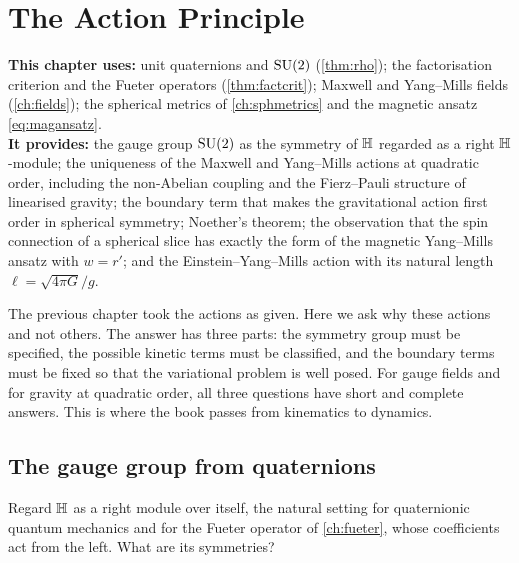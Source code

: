 \chapter{The Action Principle}
\label{ch:action}

\begin{usesbox}
\textbf{This chapter uses:} unit quaternions and $\mathrm{SU}(2)$ (\cref{thm:rho}); the factorisation criterion and the Fueter operators (\cref{thm:factcrit}); Maxwell and Yang--Mills fields (\cref{ch:fields}); the spherical metrics of \cref{ch:sphmetrics} and the magnetic ansatz \eqref{eq:magansatz}.\\
\textbf{It provides:} the gauge group $\mathrm{SU}(2)$ as the symmetry of $\mathbb{H}$ regarded as a right $\mathbb{H}$-module; the uniqueness of the Maxwell and Yang--Mills actions at quadratic order, including the non-Abelian coupling and the Fierz--Pauli structure of linearised gravity; the boundary term that makes the gravitational action first order in spherical symmetry; Noether's theorem; the observation that the spin connection of a spherical slice has exactly the form of the magnetic Yang--Mills ansatz with $w=r'$; and the Einstein--Yang--Mills action with its natural length $\ell=\sqrt{4\pi G}/g$.
\end{usesbox}

The previous chapter took the actions as given. Here we ask why these actions and not others. The answer has three parts: the symmetry group must be specified, the possible kinetic terms must be classified, and the boundary terms must be fixed so that the variational problem is well posed. For gauge fields and for gravity at quadratic order, all three questions have short and complete answers. This is where the book passes from kinematics to dynamics.

\section{The gauge group from quaternions}

Regard $\mathbb{H}$ as a right module over itself, the natural setting for quaternionic quantum mechanics and for the Fueter operator of \cref{ch:fueter}, whose coefficients act from the left. What are its symmetries?

